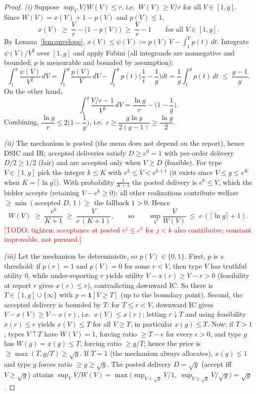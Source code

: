 \documentclass[11pt]{article}
\newcommand{\todo}[1]{\textcolor{red}{[TODO: #1]}}
\theoremstyle{remark}
\begin{document}
\begin{proof}
\emph{(i)} Suppose $\sup_V V/W(V)\le r$, i.e.\ $W(V)\ge V/r$ for all
$V\in[1,g]$. Since $W(V)=x(V)+1-p(V)$ and $p(V)\le1$,
\[
x(V)\;\ge\;\frac{V}{r}-\big(1-p(V)\big)\;\ge\;\frac{V}{r}-1
\qquad\text{for all }V\in[1,g].
\]
By Lemma~\ref{lem:envelope},
$x(V)\le\psi(V):=p(V)\,V-\int_1^V p(t)\,dt$. Integrate
$\psi(V)/V^2$ over $[1,g]$ and apply Fubini (all integrands are
nonnegative and bounded; $p$ is measurable and bounded by assumption):
\[
\int_1^g\frac{\psi(V)}{V^2}\,dV
=\int_1^g\frac{p(V)}{V}\,dV-\int_1^g p(t)\Big(\frac1t-\frac1g\Big)dt
=\frac1g\int_1^g p(t)\,dt\;\le\;\frac{g-1}{g}.
\]
On the other hand,
\[
\int_1^g\frac{V/r-1}{V^2}\,dV
=\frac{\ln g}{r}-\Big(1-\frac1g\Big).
\]
Combining, $\dfrac{\ln g}{r}\le 2\Big(1-\dfrac1g\Big)$, i.e.\
$r\ge\dfrac{g\ln g}{2(g-1)}\ge\dfrac{\ln g}{2}$.

\emph{(ii)} The mechanism is posted (the menu does not depend on the
report), hence DSIC and IR; accepted deliveries satisfy $D\ge e^0=1$ with
per-order delivery $D/2\ge1/2$ (fair) and are accepted only when
$V\ge D$ (feasible). For type $V\in[1,g]$ pick the integer $k\le K$ with
$e^k\le V<e^{k+1}$ (it exists since $V\le g\le e^K$ when $K=\lceil \ln g
\rceil$). With probability $\frac1{K+1}$ the posted delivery is $e^k\le V$,
which the bidder accepts (retaining $V-e^k\ge0$); all other realizations
contribute welfare $\ge\min(\text{accepted }D,\,1)\ge$ the fallback $1>0$.
Hence
\[
W(V)\;\ge\;\frac{e^k}{K+1}\;\ge\;\frac{V}{e\,(K+1)},
\qquad\text{so}\qquad
\sup_V\frac{V}{W(V)}\;\le\;e\,(\lceil\ln g\rceil+1).
\]
\todo{tighten: acceptance at posted $e^j\le e^k$ for $j<k$ also
contributes; constant improvable, not pursued.}

\emph{(iii)} Let the mechanism be deterministic, so $p(V)\in\{0,1\}$.
First, $p$ is a threshold: if $p(r)=1$ and $p(V)=0$ for some $r<V$, then
type $V$ has truthful utility $0$, while under-reporting $r$ yields utility
$V-x(r)\ge V-r>0$ (feasibility at report $r$ gives $x(r)\le r$),
contradicting downward IC. So there is $T\in[1,g]\cup\{\infty\}$ with
$p=\mathbf 1[V\ge T]$ (up to the boundary point). Second, the accepted
delivery is bounded by $T$: for $T\le r<V$, downward IC gives
$V-x(V)\ge V-x(r)$, i.e.\ $x(V)\le x(r)$; letting $r\downarrow T$ and
using feasibility $x(r)\le r$ yields $x(V)\le T$ for all $V\ge T$, in
particular $x(g)\le T$. Now: if $T>1$, types $V\uparrow T$ have $W(V)=1$,
forcing ratio $\ge T-\epsilon$ for every $\epsilon>0$, and type $g$ has
$W(g)=x(g)\le T$, forcing ratio $\ge g/T$; hence the price is
$\ge\max(T,g/T)\ge\sqrt g$. If $T=1$ (the mechanism always allocates),
$x(g)\le1$ and type $g$ forces ratio $\ge g\ge\sqrt g$. The posted
delivery $D=\sqrt g$ (accept iff $V\ge\sqrt g$) attains
$\sup_V V/W(V)=\max\big(\sup_{V<\sqrt g}V/1,\;
\sup_{V\ge\sqrt g}V/\sqrt g\big)=\sqrt g$.
\end{proof}
\end{document}
